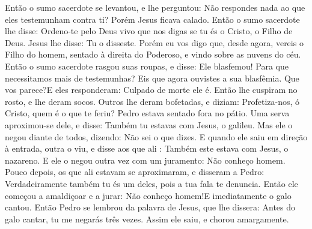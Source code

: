 {  Então o sumo sacerdote se levantou, e lhe perguntou: Não respondes nada ao que eles testemunham contra ti?
  Porém Jesus ficava calado. Então o sumo sacerdote lhe disse: Ordeno-te
 pelo Deus vivo que nos digas se tu és o Cristo, o Filho de Deus.
  Jesus lhe disse: Tu o disseste. Porém eu vos digo que, desde agora, vereis o Filho do homem, sentado à direita do Poderoso,
 e vindo sobre as nuvens do céu.
  Então o sumo sacerdote rasgou suas roupas, e disse: Ele blasfemou! Para que necessitamos mais de testemunhas? Eis que agora ouvistes a sua blasfêmia.
  Que vos parece?E eles responderam: Culpado de morte ele é.
  Então lhe cuspiram no rosto, e lhe deram socos.
  Outros lhe deram bofetadas, e diziam: Profetiza-nos, ó Cristo, quem é o que te feriu?
  Pedro estava sentado fora no pátio. Uma serva aproximou-se dele, e disse: Também tu estavas com Jesus, o galileu.
  Mas ele o negou diante de todos, dizendo: Não sei o que dizes.
  E quando ele saiu em direção à entrada, outra o viu, e disse aos que ali
{} : Também este estava com Jesus, o nazareno.
  E ele o negou outra vez com um juramento: Não conheço
{} homem.
  Pouco depois, os que ali estavam se aproximaram, e disseram a Pedro: Verdadeiramente também tu és um deles, pois a tua fala
 te denuncia.
  Então ele começou a amaldiçoar e a jurar: Não conheço
{} homem!E imediatamente o galo cantou.
  Então Pedro se lembrou da palavra de Jesus, que lhe dissera: Antes do galo cantar, tu me negarás três vezes. Assim ele saiu, e chorou amargamente.
\par }

